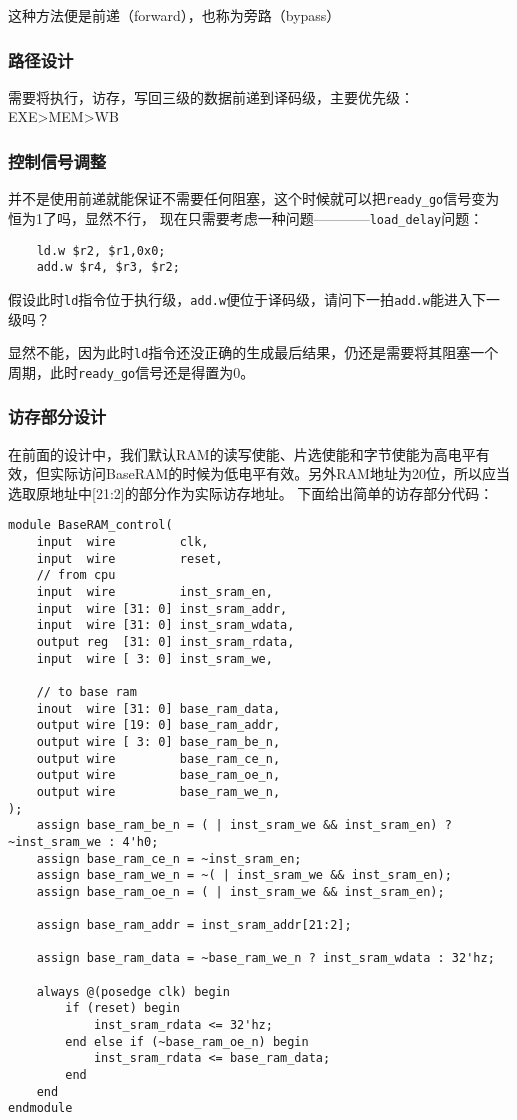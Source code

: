 这种方法便是前递（forward），也称为旁路（bypass）

\subsubsection{路径设计}

需要将执行，访存，写回三级的数据前递到译码级，主要优先级：EXE>MEM>WB

\subsubsection{控制信号调整}

并不是使用前递就能保证不需要任何阻塞，这个时候就可以把\texttt{ready\_go}信号变为恒为1了吗，显然不行，
现在只需要考虑一种问题————\texttt{load\_delay}问题：

\begin{verbatim}
    ld.w $r2, $r1,0x0;
    add.w $r4, $r3, $r2;
\end{verbatim}

假设此时\texttt{ld}指令位于执行级，\texttt{add.w}便位于译码级，请问下一拍\texttt{add.w}能进入下一级吗？

显然不能，因为此时\texttt{ld}指令还没正确的生成最后结果，仍还是需要将其阻塞一个周期，此时\texttt{ready\_go}信号还是得置为0。

\subsubsection{访存部分设计}
 在前面的设计中，我们默认RAM的读写使能、片选使能和字节使能为高电平有效，但实际访问BaseRAM的时候为低电平有效。另外RAM地址为20位，所以应当选取原地址中[21:2]的部分作为实际访存地址。
下面给出简单的访存部分代码：

\begin{lstlisting}
module BaseRAM_control(
    input  wire         clk,
    input  wire         reset,
    // from cpu
    input  wire         inst_sram_en,
    input  wire [31: 0] inst_sram_addr, 
    input  wire [31: 0] inst_sram_wdata,
    output reg  [31: 0] inst_sram_rdata,
    input  wire [ 3: 0] inst_sram_we,

    // to base ram
    inout  wire [31: 0] base_ram_data,
    output wire [19: 0] base_ram_addr,
    output wire [ 3: 0] base_ram_be_n,
    output wire         base_ram_ce_n,
    output wire         base_ram_oe_n,
    output wire         base_ram_we_n,
);
    assign base_ram_be_n = ( | inst_sram_we && inst_sram_en) ? ~inst_sram_we : 4'h0;
    assign base_ram_ce_n = ~inst_sram_en;
    assign base_ram_we_n = ~( | inst_sram_we && inst_sram_en);
    assign base_ram_oe_n = ( | inst_sram_we && inst_sram_en);

    assign base_ram_addr = inst_sram_addr[21:2];

    assign base_ram_data = ~base_ram_we_n ? inst_sram_wdata : 32'hz;

    always @(posedge clk) begin
        if (reset) begin
            inst_sram_rdata <= 32'hz;
        end else if (~base_ram_oe_n) begin
            inst_sram_rdata <= base_ram_data;
        end
    end
endmodule

\end{lstlisting}


